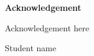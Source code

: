 \newpage
\thispagestyle{empty}
\vspace*{3in}
\centering
\begin{normalsize}
\textbf{Acknowledgement}
\vspace{2cm}
\end{normalsize}


\par Acknowledgement here

\vspace{2cm}
\hspace*{4in}  Student name

